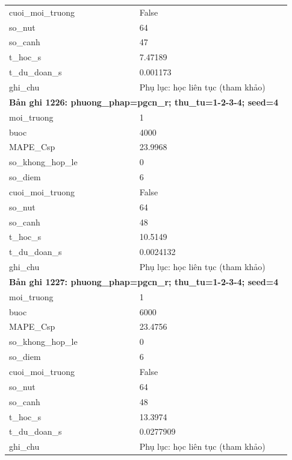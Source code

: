 \begin{longtable}{p{0.43\linewidth}p{0.50\linewidth}}
cuoi\_\allowbreak moi\_\allowbreak truong & False \\
so\_\allowbreak nut & 64 \\
so\_\allowbreak canh & 47 \\
t\_\allowbreak hoc\_\allowbreak s & 7.47189 \\
t\_\allowbreak du\_\allowbreak doan\_\allowbreak s & 0.001173 \\
ghi\_\allowbreak chu & Phụ lục: học liên tục (tham khảo) \\
\midrule
\multicolumn{2}{p{0.95\linewidth}}{\textbf{Bản ghi 1226: phuong\_phap=pgcn\_r; thu\_tu=1-2-3-4; seed=4}} \\
moi\_\allowbreak truong & 1 \\
buoc & 4000 \\
MAPE\_\allowbreak Csp & 23.9968 \\
so\_\allowbreak khong\_\allowbreak hop\_\allowbreak le & 0 \\
so\_\allowbreak diem & 6 \\
cuoi\_\allowbreak moi\_\allowbreak truong & False \\
so\_\allowbreak nut & 64 \\
so\_\allowbreak canh & 48 \\
t\_\allowbreak hoc\_\allowbreak s & 10.5149 \\
t\_\allowbreak du\_\allowbreak doan\_\allowbreak s & 0.0024132 \\
ghi\_\allowbreak chu & Phụ lục: học liên tục (tham khảo) \\
\midrule
\multicolumn{2}{p{0.95\linewidth}}{\textbf{Bản ghi 1227: phuong\_phap=pgcn\_r; thu\_tu=1-2-3-4; seed=4}} \\
moi\_\allowbreak truong & 1 \\
buoc & 6000 \\
MAPE\_\allowbreak Csp & 23.4756 \\
so\_\allowbreak khong\_\allowbreak hop\_\allowbreak le & 0 \\
so\_\allowbreak diem & 6 \\
cuoi\_\allowbreak moi\_\allowbreak truong & False \\
so\_\allowbreak nut & 64 \\
so\_\allowbreak canh & 48 \\
t\_\allowbreak hoc\_\allowbreak s & 13.3974 \\
t\_\allowbreak du\_\allowbreak doan\_\allowbreak s & 0.0277909 \\
ghi\_\allowbreak chu & Phụ lục: học liên tục (tham khảo) \\

\end{longtable}

